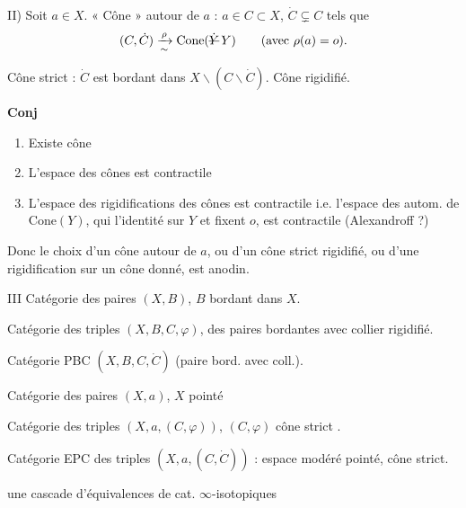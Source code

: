 \documentclass[11pt,a4paper]{article}
\begin{document}
\marginal{\struck{\ill{}}}

II) Soit $a \in X$. « Cône » autour de $a$ : $a \in C \subset X$, $\dot C \subsetneq C$ tels que
\[
  (C, \dot C) \xrightarrow[\sim]{\rho} \mathrm{Cone}(\text{\struck{$\dot Y$}}\, Y) \qquad (\text{avec } \rho(a) = o).
\]

Cône strict : $\dot C$ est bordant dans $X \smallsetminus (C \smallsetminus \dot C)$. Cône rigidifié.

\textbf{Conj}
\begin{enumerate}
  \item[a)] Existe cône 
  \item[b)] L'espace des cônes  est contractile
  \item[c)] L'espace des rigidifications des cônes est contractile i.e. l'espace des autom. de $\mathrm{Cone}(Y)$, qui  l'identité sur $Y$ et fixent $o$, est contractile (Alexandroff ?)
\end{enumerate}
Donc le choix d'un cône  autour de $a$, ou d'un cône strict rigidifié, ou d'une  rigidification sur un cône donné, est anodin.

III Catégorie  des paires $(X, B)$, $B$ bordant dans $X$.

Catégorie  des  triples $(X, B, C, \varphi)$, des paires bordantes avec collier  rigidifié.

Catégorie PBC $(X, B, C, \dot C)$ (paire bord. avec coll.).

Catégorie  des paires $(X, a)$, $X$ pointé

Catégorie  des triples $(X, a, (C, \varphi))$, $(C, \varphi)$ cône strict .

Catégorie EPC des triples $(X, a, (C, \dot C))$ : espace modéré pointé,  cône strict.

 une cascade d'équivalences de cat. \struck{\ill{}} $\infty$-isotopiques


\end{document}
